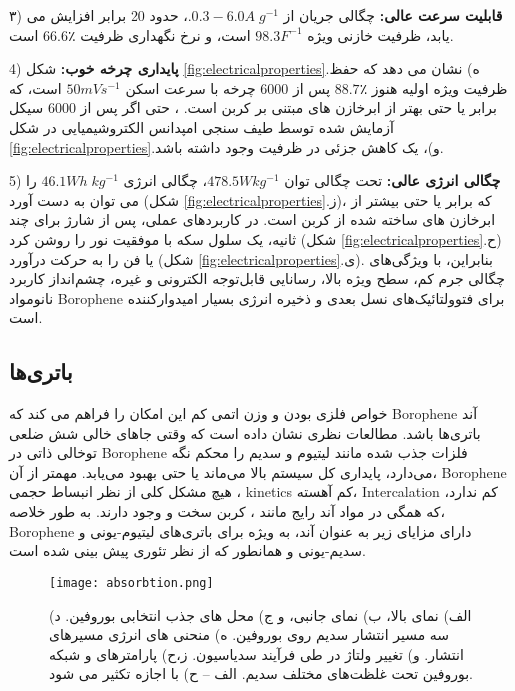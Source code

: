 ۳) \textbf{قابلیت سرعت عالی:} چگالی جریان از $.0.3-6.0 A\; g^{-1}$، حدود 20 برابر افزایش می یابد، ظرفیت خازنی ویژه $98.3 F^{-1}$ است، و نرخ نگهداری ظرفیت $66.6٪$ است\cite{liScalableProductionFewLayer2018}.

4) \textbf{پایداری چرخه خوب:} شکل \ref{fig:electricalproperties}.ه) نشان می دهد که حفظ ظرفیت ویژه اولیه هنوز $88.7٪$ پس از 6000 چرخه با سرعت اسکن $50 mV s^{-1}$ است، \cite{liScalableProductionFewLayer2018} که برابر یا حتی بهتر از ابرخازن های مبتنی بر کربن است. ، حتی اگر پس از 6000 سیکل آزمایش شده توسط طیف سنجی امپدانس الکتروشیمیایی در شکل \ref{fig:electricalproperties}.و)، یک کاهش جزئی در ظرفیت وجود داشته باشد. 

5) \textbf{چگالی انرژی عالی: }تحت چگالی توان $478.5 W kg^{-1}$، چگالی انرژی $46.1 Wh\; kg^{-1}$ را می توان به دست آورد (شکل \ref{fig:electricalproperties}.ز)،\cite{shaoHighperformanceFlexibleAsymmetric2013} که برابر یا حتی بیشتر از ابرخازن های ساخته شده از کربن است. در کاربردهای عملی، پس از شارژ برای چند ثانیه، یک سلول سکه با موفقیت نور را روشن کرد (شکل \ref{fig:electricalproperties}.ح) یا فن را به حرکت درآورد (شکل \ref{fig:electricalproperties}.ی). بنابراین، با ویژگی‌های چگالی جرم کم، سطح ویژه بالا، رسانایی قابل‌توجه الکترونی و غیره، چشم‌انداز کاربرد نانومواد \gls{Borophene} برای فتوولتائیک‌های نسل بعدی و ذخیره انرژی بسیار امیدوارکننده است.

\subsection{باتری‌ها}
خواص فلزی بودن و وزن اتمی کم این امکان را فراهم می کند که \gls{Borophene} آند باتری‌ها باشد. مطالعات نظری نشان داده است \cite{atacaHydrogenStorageCalcium2009} که وقتی جاهای خالی شش ضلعی توخالی ذاتی در \gls{Borophene} فلزات جذب شده مانند لیتیوم و سدیم را محکم نگه می‌دارد، پایداری کل سیستم بالا می‌ماند یا حتی بهبود می‌یابد. مهمتر از آن، \gls{Borophene} هیچ مشکل کلی از نظر انبساط حجمی ، \gls{kinetics} کم آهسته، \gls{Intercalation} کم ندارد، که همگی در مواد آند رایج مانند ، کربن سخت و  وجود دارند.\cite{ponrouchHighCapacityHard2013, alcantaraNiCo2O4SpinelFirst2002,liuUltrasmallSnNanoparticles2015} به طور خلاصه، \gls{Borophene} دارای مزایای زیر به عنوان آند، به ویژه برای باتری‌های لیتیوم-یونی و سدیم-یونی و  همانطور که از نظر تئوری پیش بینی شده است.
\begin{figure*}
    \centering
    \texttt{[image: absorbtion.png]}
    \caption{الف) نمای بالا، ب) نمای جانبی، و ج) محل های جذب انتخابی  بوروفین. د) سه مسیر انتشار سدیم روی بوروفین. ه) منحنی های انرژی مسیرهای انتشار. و) تغییر ولتاژ در طی فرآیند سدیاسیون. ز،ح) پارامترهای  و شبکه بوروفین تحت غلظت‌های مختلف سدیم. الف – ح) با اجازه تکثیر می شود.}
    \label{fig:absorbtion}
\end{figure*}

